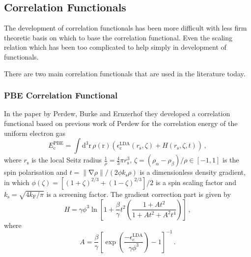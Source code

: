 \documentclass{article}
\theoremstyle{plain}\theoremheaderfont{\normalfont\itshape}\theorembodyfont{\rmfamily}\theoremseparator{.}\newtheorem*{rem}{Remark}\newtheorem*{ex}{Example}\newtheorem*{proof}{Proof}\newtheorem*{altp}{Alternative proof}
\theoremstyle{plain}\theoremheaderfont{\normalfont\bfseries}\theorembodyfont{\rmfamily}\theoremseparator{.}\newtheorem{thm}{Theorem}[section]\newtheorem{lem}[thm]{Lemma}\newtheorem{prop}[thm]{Proposition}\newtheorem*{cor}{Corollary}\newtheorem{defn}[thm]{Definition}\newtheorem{clm}[thm]{Claim}\newtheorem{clminproof}{Claim}
\theoremstyle{break}\theoremheaderfont{\normalfont\itshape}\theorembodyfont{\rmfamily}\theoremseparator{.\medskip}\newtheorem*{proofskip}{Proof}\newtheorem*{exs}{Examples}\newtheorem*{rems}{Remarks}
\theoremstyle{break}\theoremheaderfont{\normalfont\bfseries}\theorembodyfont{\rmfamily}\theoremseparator{.\medskip}\newtheorem{lemskip}[thm]{Lemma}\newtheorem{defnskip}[thm]{Definition}\newtheorem{propskip}[thm]{Proposition}\newtheorem{thmskip}[thm]{Theorem}
\numberwithin{equation}{section}
\newcommand{\dd}[2][]{\mathrm{d}^{#1} #2\,}
\newcommand{\vb}[1]{\bm{\mathrm{#1}}}
\newcommand{\norm}[1]{\left\| #1 \right\|}
\newcommand{\grad}{\vb{\nabla}}
\newcommand{\s}{_{\text{s}}}
\newcommand{\corr}{_{\text{c}}}
\begin{document}
    \subsection{Correlation Functionals}
    The development of correlation functionals has been more difficult with less firm theoretic basis on which to base the correlation functional. Even the scaling relation which has been too complicated to help simply in development of functionals.

    There are two main correlation functionals that are used in the literature today.

    \subsubsection{PBE Correlation Functional}
    In the paper by Perdew, Burke and Ernzerhof they developed a correlation functional based on previous work of Perdew for the correlation energy of the uniform electron gas
    \begin{equation}
        E\corr^{\text{PBE}}=\int\dd[3]{\vb{r}}\rho(\vb{r})\left(\epsilon\corr^{\text{LDA}}(r\s,\zeta)+H(r\s,\zeta,t)\right)\,,
    \end{equation}
    where \(r\s\) is the local Seitz radius \(\frac{1}{\rho}=\frac{4}{3}\pi r\s^3\), \(\zeta=(\rho_\alpha-\rho_\beta)/\rho\in[-1,1]\) is the spin polarisation and \(t=\norm{\grad\rho}/(2\phi k\s\rho)\) is a dimensionless density gradient, in which \(\phi(\zeta)=[(1+\zeta)^{2/3}+(1-\zeta)^{2/3}]/2\) is a spin scaling factor and \(k\s=\sqrt{4k_{\text{F}}/\pi}\) is a screening factor. The gradient correction part is given by
    \begin{equation}
        H=\gamma\phi^3\ln\left[1+\frac{\beta}{\gamma}t^2\left(\frac{1+At^2}{1+At^2+A^2t^4}\right)\right]\,,
    \end{equation}
    where
    \begin{equation}
        A=\frac{\beta}{\gamma}\left[\exp\left(\frac{-\epsilon\corr^{\text{LDA}}}{\gamma\phi^3}\right)-1\right]^{-1}\,.
    \end{equation}
\end{document}
